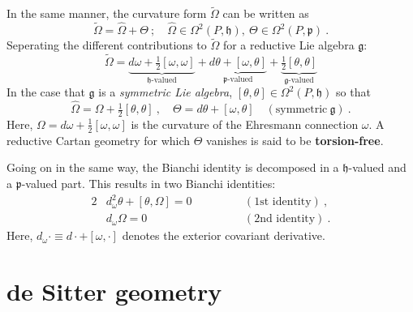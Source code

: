 \documentclass[11pt]{amsart}
\begin{document}
In the same manner, the curvature form $\tilde{\Omega}$ can be 
written as
%
\begin{displaymath}
	\tilde{\Omega} = \hat{\Omega} + \Theta~;\quad
	\hat{\Omega} \in \Omega^2(P,\mathfrak{h}),~
	\Theta \in \Omega^2(P,\mathfrak{p})~.
\end{displaymath}
%
Seperating the different contributions to $\tilde{\Omega}$ for a 
reductive Lie algebra $\mathfrak{g}$: 
%
\begin{displaymath}
	\tilde{\Omega} = \underbrace{d\omega + 
		\tfrac{1}{2}[\omega,\omega]}_{\mathfrak{h}\text{-valued}}
	+ \underbrace{d\theta + 
		[\omega,\theta]}_{\mathfrak{p}\text{-valued}} + 
	\underbrace{\tfrac{1}{2}[\theta,\theta]}_{\mathfrak{g}\text{-valued}}
\end{displaymath}
In the case that $\mathfrak{g}$ is a \emph{symmetric Lie 
	algebra}, $[\theta,\theta] \in \Omega^2(P,\mathfrak{h})$ so 
that
\begin{displaymath}
	\hat{\Omega} = \Omega + \tfrac{1}{2}[\theta,\theta]~,\quad
	\Theta = d\theta + [\omega,\theta]\quad
	(\text{symmetric}~\mathfrak{g})~.
\end{displaymath}
Here, $\Omega = d\omega + \tfrac{1}{2}[\omega,\omega]$ is the 
curvature of the Ehresmann connection $\omega$. A reductive 
Cartan geometry for which $\Theta$ vanishes is said to be 
\textbf{torsion-free}.

Going on in the same way, the Bianchi identity is decomposed in a 
$\mathfrak{h}$-valued and a $\mathfrak{p}$-valued part. This 
results in two Bianchi identities:
%
\begin{alignat*}{2}
	&d^2_\omega\theta + [\theta,\Omega] = 0&\qquad\quad&(\text{1st 
		identity})~,\\
	&d_\omega \Omega = 0&&(\text{2nd identity})~.
\end{alignat*}
Here, $d_\omega \cdot \equiv d\cdot + [\omega,\cdot]$ denotes the 
exterior covariant derivative. 

\section{de Sitter geometry}
\end{document}
